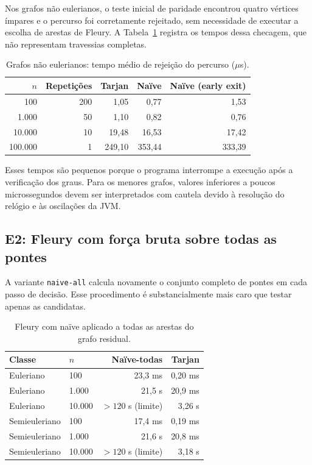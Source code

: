 \documentclass[12pt,a4paper]{article}
\begin{document}
Nos grafos não eulerianos, o teste inicial de paridade encontrou quatro
vértices ímpares e o percurso foi corretamente rejeitado, sem necessidade
de executar a escolha de arestas de Fleury. A Tabela~\ref{tab:naoeuleriano}
registra os tempos dessa checagem, que não representam travessias completas.

\begin{table}[H]
\centering\small
\caption{Grafos não eulerianos: tempo médio de rejeição do percurso ($\mu$s).}
\label{tab:naoeuleriano}
\begin{tabular}{@{}rrrrr@{}}
\toprule
$n$ & Repetições & Tarjan & Naïve & Naïve (early exit) \\
\midrule
100 & 200 & 1,05 & 0,77 & 1,53 \\
1.000 & 50 & 1,10 & 0,82 & 0,76 \\
10.000 & 10 & 19,48 & 16,53 & 17,42 \\
100.000 & 1 & 249,10 & 353,44 & 333,39 \\
\bottomrule
\end{tabular}
\end{table}

Esses tempos são pequenos porque o programa interrompe a execução
após a verificação dos graus. Para os menores grafos, valores inferiores
a poucos microssegundos devem ser interpretados com cautela devido à
resolução do relógio e às oscilações da JVM.

\subsection{E2: Fleury com força bruta sobre todas as pontes}
A variante \texttt{naive-all} calcula novamente o conjunto completo de
pontes em cada passo de decisão. Esse procedimento é substancialmente
mais caro que testar apenas as candidatas.

\begin{table}[H]
\centering\small
\caption{Fleury com naïve aplicado a todas as arestas do grafo residual.}
\label{tab:naiveall}
\begin{tabular}{@{}llrr@{}}
\toprule
Classe & $n$ & Naïve-todas & Tarjan \\
\midrule
Euleriano & 100 & 23,3 ms & 0,20 ms \\
Euleriano & 1.000 & 21,5 s & 20,9 ms \\
Euleriano & 10.000 & $>120$ s (limite) & 3,26 s \\
Semieuleriano & 100 & 17,4 ms & 0,19 ms \\
Semieuleriano & 1.000 & 21,6 s & 20,8 ms \\
Semieuleriano & 10.000 & $>120$ s (limite) & 3,18 s \\
\bottomrule
\end{tabular}
\end{table}
\end{document}

